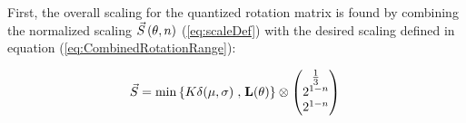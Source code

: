 First, the overall scaling for the quantized rotation matrix is found by combining the normalized scaling $\Scale[\theta, n]$ (\ref{eq:scaleDef}) with the desired scaling defined in equation (\ref{eq:CombinedRotationRange}):

\begin{equation*}
\Scale =
 \min\left\{K \delta(\mu,\sigma) \right. ,  \left. \mathbf{L}(\theta) \right\}  \otimes
\begin{pmatrix}
  \frac{1}{3} \\
 2^{1-n } \\
 2^{1-n }  \\
\end{pmatrix}    \\
\end{equation*}

